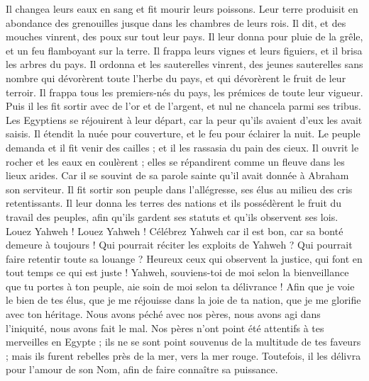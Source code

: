 \begin{multicols}{2}
Il changea leurs eaux en sang et fit mourir leurs poissons.
Leur terre produisit en abondance des grenouilles jusque dans les chambres de leurs rois.
Il dit, et des mouches vinrent, des poux sur tout leur pays.
Il leur donna pour pluie de la grêle, et un feu flamboyant sur la terre.
Il frappa leurs vignes et leurs figuiers, et il brisa les arbres du pays.
Il ordonna et les sauterelles vinrent, des jeunes sauterelles sans nombre
qui dévorèrent toute l'herbe du pays, et qui dévorèrent le fruit de leur terroir.
Il frappa tous les premiers-nés du pays, les prémices de toute leur vigueur.
Puis il les fit sortir avec de l'or et de l'argent, et nul ne chancela parmi ses tribus.
Les Egyptiens se réjouirent à leur départ, car la peur qu'ils avaient d'eux les avait saisis.
Il étendit la nuée pour couverture, et le feu pour éclairer la nuit.
Le peuple demanda et il fit venir des cailles ; et il les rassasia du pain des cieux.
Il ouvrit le rocher et les eaux en coulèrent ; elles se répandirent comme un fleuve dans les lieux arides.
Car il se souvint de sa parole sainte qu’il avait donnée à Abraham son serviteur.
Il fit sortir son peuple dans l’allégresse, ses élus au milieu des cris retentissants.
Il leur donna les terres des nations et ils possédèrent le fruit du travail des peuples,
afin qu'ils gardent ses statuts et qu'ils observent ses lois. Louez Yahweh !
\VerseOne{}Louez Yahweh ! Célébrez Yahweh car il est bon, car sa bonté demeure à toujours !
Qui pourrait réciter les exploits de Yahweh ? Qui pourrait faire retentir toute sa louange ?
Heureux ceux qui observent la justice, qui font en tout temps ce qui est juste !
Yahweh, souviens-toi de moi selon la bienveillance que tu portes à ton peuple, aie soin de moi selon ta délivrance !
Afin que je voie le bien de tes élus, que je me réjouisse dans la joie de ta nation, que je me glorifie avec ton héritage.
Nous avons péché avec nos pères, nous avons agi dans l’iniquité, nous avons fait le mal.
Nos pères n'ont point été attentifs à tes merveilles en Egypte ; ils ne se sont point souvenus de la multitude de tes faveurs ; mais ils furent rebelles près de la mer, vers la mer rouge.
Toutefois, il les délivra pour l'amour de son Nom, afin de faire connaître sa puissance.

\end{multicols}
